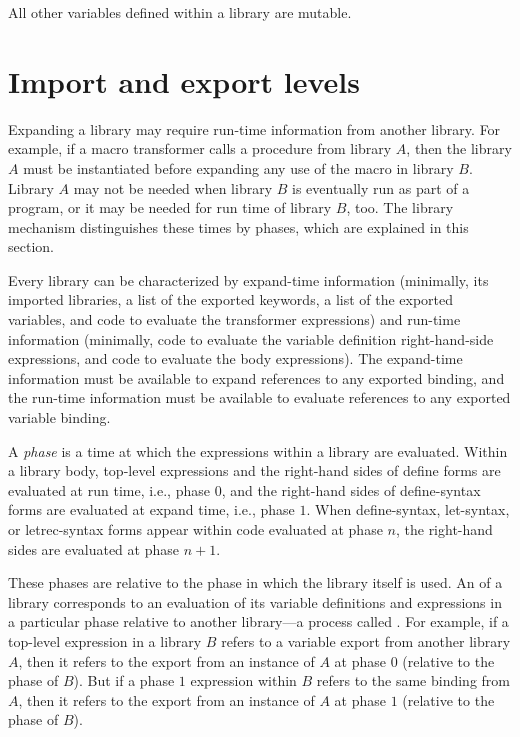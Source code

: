 All other variables defined within a library are mutable.

\section{Import and export levels}
\label{phasessection}

Expanding a library may require run-time information from another
library.  For example, if a macro transformer calls a
procedure from library $A$, then the library $A$ must be
instantiated before expanding any use of the macro in library $B$.  Library $A$ may
not be
needed when library $B$ is eventually run as part of a program, or it
may be needed for run time of library $B$, too.  The library
mechanism distinguishes these times by phases, which are explained in
this section.

Every library can be characterized by expand-time information (minimally,
its imported libraries, a list of the exported keywords, a list of the
exported variables, and code to evaluate the transformer expressions) and
run-time information (minimally, code to evaluate the variable definition
right-hand-side expressions, and code to evaluate the body expressions).
The expand-time information must be available to expand references to
any exported binding, and the run-time information must be available to
evaluate references to any exported variable binding.

%
A \emph{phase} is a time at which the expressions within a library are
evaluated.
Within a library body, top-level expressions and
the right-hand sides of {\cf define} forms are evaluated at run time,
i.e., phase $0$, and the right-hand
sides of {\cf define-syntax} forms are evaluated at expand time, i.e.,
phase $1$.
When {\cf define-syntax},
{\cf let-syntax}, or {\cf letrec-syntax}
forms appear within code evaluated at phase $n$, the right-hand sides
are evaluated at phase $n+1$.

These phases are relative to the phase in which the library itself is
used.
An  of a library corresponds to an evaluation of its
variable definitions and expressions in a particular phase relative to another
library---a process called .
For example, if a top-level expression in a library $B$ refers to
a variable export from another library $A$, then it refers to the export from an
instance of $A$ at phase $0$ (relative to the phase of $B$).
But if a phase $1$ expression within $B$ refers to the same binding from
$A$, then it refers to the export from an instance of $A$ at phase $1$
(relative to the phase of $B$).

